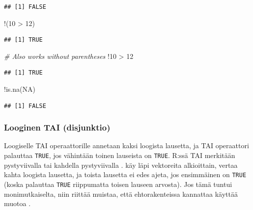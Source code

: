 \documentclass[
]{book}
\newenvironment{Shaded}{\begin{snugshade}}{\end{snugshade}}
\newcommand{\CommentTok}[1]{\textcolor[rgb]{0.56,0.35,0.01}{\textit{#1}}}
\newcommand{\ConstantTok}[1]{\textcolor[rgb]{0.00,0.00,0.00}{#1}}
\newcommand{\DecValTok}[1]{\textcolor[rgb]{0.00,0.00,0.81}{#1}}
\newcommand{\FunctionTok}[1]{\textcolor[rgb]{0.00,0.00,0.00}{#1}}
\newcommand{\NormalTok}[1]{#1}
\newcommand{\SpecialCharTok}[1]{\textcolor[rgb]{0.00,0.00,0.00}{#1}}
\begin{document}
\begin{verbatim}
## [1] FALSE
\end{verbatim}

\begin{Shaded}
\begin{Highlighting}[]
\SpecialCharTok{!}\NormalTok{(}\DecValTok{10} \SpecialCharTok{\textgreater{}} \DecValTok{12}\NormalTok{)}
\end{Highlighting}
\end{Shaded}

\begin{verbatim}
## [1] TRUE
\end{verbatim}

\begin{Shaded}
\begin{Highlighting}[]
\CommentTok{\# Also works without parentheses}
\SpecialCharTok{!}\DecValTok{10} \SpecialCharTok{\textgreater{}} \DecValTok{12}
\end{Highlighting}
\end{Shaded}

\begin{verbatim}
## [1] TRUE
\end{verbatim}

\begin{Shaded}
\begin{Highlighting}[]
\SpecialCharTok{!}\FunctionTok{is.na}\NormalTok{(}\ConstantTok{NA}\NormalTok{)}
\end{Highlighting}
\end{Shaded}

\begin{verbatim}
## [1] FALSE
\end{verbatim}

\hypertarget{looginen-tai-disjunktio}{%
\subsubsection{Looginen TAI (disjunktio)}\label{looginen-tai-disjunktio}}

Loogiselle TAI operaattorille annetaan kaksi loogista lausetta, ja TAI operaattori palauttaa \texttt{TRUE}, jos vähintään toinen lauseista on \texttt{TRUE}. R:ssä TAI merkitään pystyviivalla \texttt{\textbar{}} tai kahdella pystyviivalla \texttt{\textbar{}\textbar{}}. \texttt{\textbar{}} käy läpi vektoreita alkioittain, \texttt{\textbar{}\textbar{}} vertaa kahta loogista lausetta, ja toista lausetta ei edes ajeta, jos ensimmäinen on \texttt{TRUE} (koska \texttt{\textbar{}\textbar{}} palauttaa \texttt{TRUE} riippumatta toisen lauseen arvosta). Jos tämä tuntui monimutkaiselta, niin riittää muistaa, että ehtorakenteissa kannattaa käyttää muotoa \texttt{\textbar{}\textbar{}}.
\end{document}
